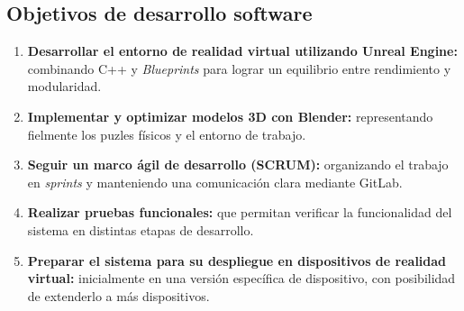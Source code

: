 \subsection{Objetivos de desarrollo software}
\label{Objetivos de desarrollo}
\begin{enumerate}
    \item \textbf{Desarrollar el entorno de realidad virtual utilizando Unreal Engine:} combinando C++ y \textit{Blueprints} para lograr un equilibrio entre rendimiento y modularidad.
    
    \item \textbf{Implementar y optimizar modelos 3D con Blender:} representando fielmente los puzles físicos y el entorno de trabajo.
    
    \item \textbf{Seguir un marco ágil de desarrollo (SCRUM):} organizando el trabajo en \textit{sprints} y manteniendo una comunicación clara mediante GitLab.
    
    \item \textbf{Realizar pruebas funcionales:} que permitan verificar la funcionalidad del sistema en distintas etapas de desarrollo.
    
    \item \textbf{Preparar el sistema para su despliegue en dispositivos de realidad virtual:} inicialmente en una versión específica de dispositivo, con posibilidad de extenderlo a más dispositivos.
\end{enumerate}